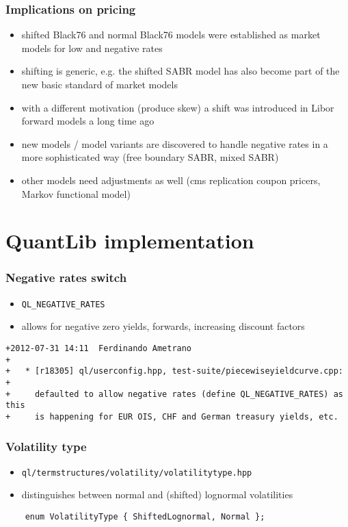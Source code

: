 \documentclass{beamer}
\begin{document}
\begin{frame}[fragile]
\frametitle{Implications on pricing}
\begin{itemize}
\item shifted Black76 and normal Black76 models were established as market models for low and negative rates
\item shifting is generic, e.g. the shifted SABR model has also become part of the new basic standard of market models
\item with a different motivation (produce skew) a shift was introduced in Libor forward models a long time ago
\item new models / model variants are discovered to handle negative rates in a more sophisticated way (free boundary SABR, mixed SABR)
\item other models need adjustments as well (cms replication coupon pricers, Markov functional model)
\end{itemize}
\end{frame}

\section{QuantLib implementation}

\begin{frame}[fragile]
\frametitle{Negative rates switch}
\begin{itemize}
\item \verb+QL_NEGATIVE_RATES+
\item allows for negative zero yields, forwards, increasing discount factors
\end{itemize}
\begin{verbatim}
+2012-07-31 14:11  Ferdinando Ametrano
+
+	* [r18305] ql/userconfig.hpp, test-suite/piecewiseyieldcurve.cpp:
+
+     defaulted to allow negative rates (define QL_NEGATIVE_RATES) as this
+     is happening for EUR OIS, CHF and German treasury yields, etc.
\end{verbatim}
\end{frame}


\begin{frame}[fragile]
\frametitle{Volatility type}
\begin{itemize}
\item \verb+ql/termstructures/volatility/volatilitytype.hpp+
\item distinguishes between normal and (shifted) lognormal volatilities
\end{itemize}
\begin{verbatim}
    enum VolatilityType { ShiftedLognormal, Normal };
\end{verbatim}
\end{frame}
\end{document}
